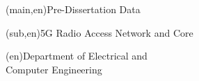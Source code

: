 
%


\nttitle(main,en){Pre-Dissertation Data}

\nttitle(sub,en){5G Radio Access Network and Core}%


\ntdepartment*(en){Department of Electrical and \\Computer Engineering}

